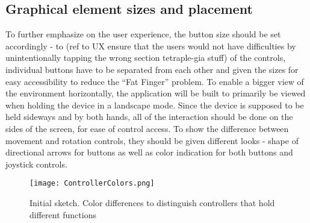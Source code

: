 \subsection{Graphical element sizes and placement}
To further emphasize on the user experience, the button size should be set accordingly - to	(ref
to UX ensure that the users would not have difficulties by unintentionally tapping the wrong section tetraple-gia stuff) of the controls, individual buttons have to be separated from each other and given the sizes for easy accessibility to reduce the “Fat Finger” problem. To enable a bigger view of the environment horizontally, the application will be built to primarily be viewed when holding the device in a landscape mode. Since the device is supposed to be held sideways and by both hands, all of the interaction should be done on the sides of the screen, for ease of control access.
To show the difference between movement and rotation controls, they should be given different looks - shape of directional arrows for buttons as well as color indication for both buttons and joystick controls.

\begin{figure}[H]
\centering
\texttt{[image: ControllerColors.png]}
\caption{Initial sketch. Color differences to distinguish controllers that hold different functions}
\end{figure}

